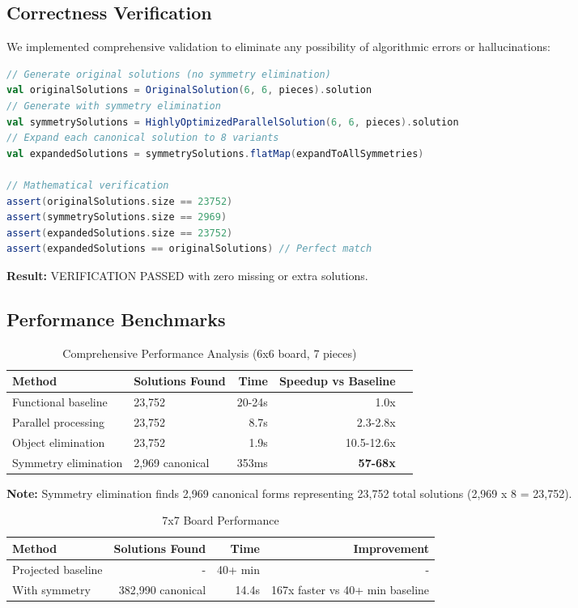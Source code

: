 \documentclass[12pt,a4paper]{article}
\theoremstyle{definition}
\begin{document}
\subsection{Correctness Verification}

We implemented comprehensive validation to eliminate any possibility of algorithmic errors or hallucinations:

\begin{lstlisting}[language=Scala, caption=Symmetry Verification Test]
// Generate original solutions (no symmetry elimination)
val originalSolutions = OriginalSolution(6, 6, pieces).solution
// Generate with symmetry elimination  
val symmetrySolutions = HighlyOptimizedParallelSolution(6, 6, pieces).solution
// Expand each canonical solution to 8 variants
val expandedSolutions = symmetrySolutions.flatMap(expandToAllSymmetries)

// Mathematical verification
assert(originalSolutions.size == 23752)
assert(symmetrySolutions.size == 2969) 
assert(expandedSolutions.size == 23752)
assert(expandedSolutions == originalSolutions) // Perfect match
\end{lstlisting}

\textbf{Result:} VERIFICATION PASSED with zero missing or extra solutions.

\subsection{Performance Benchmarks}

\begin{table}[h]
\centering
\caption{Comprehensive Performance Analysis (6x6 board, 7 pieces)}
\begin{tabular}{@{}llrrr@{}}
\toprule
Method & Solutions Found & Time & Speedup vs Baseline \\
\midrule
Functional baseline & 23,752 & 20-24s & 1.0x \\
Parallel processing & 23,752 & 8.7s & 2.3-2.8x \\
Object elimination & 23,752 & 1.9s & 10.5-12.6x \\
Symmetry elimination & 2,969 canonical & 353ms & \textbf{57-68x} \\
\bottomrule
\end{tabular}
\end{table}

\textbf{Note:} Symmetry elimination finds 2,969 canonical forms representing 23,752 total solutions (2,969 x 8 = 23,752).

\begin{table}[h]
\centering
\caption{7x7 Board Performance}
\begin{tabular}{@{}lrrr@{}}
\toprule
Method & Solutions Found & Time & Improvement \\
\midrule
Projected baseline & - & 40+ min & - \\
With symmetry & 382,990 canonical & 14.4s & 167x faster vs 40+ min baseline \\
\bottomrule
\end{tabular}
\end{table}
\end{document}
